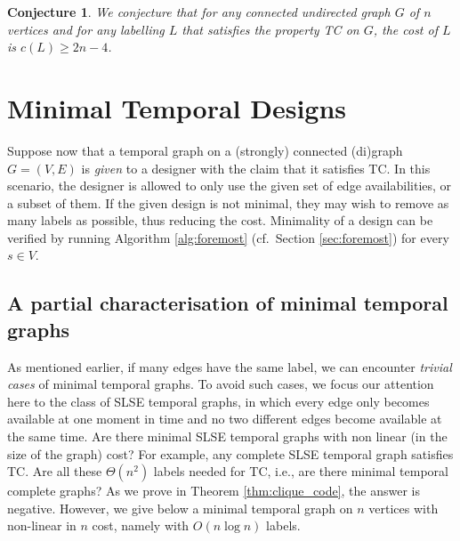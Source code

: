 \documentclass[a4paper,UKenglish]{article}
\newtheorem*{conjecture*}{Conjecture}
\begin{document}
\begin{conjecture*}
We conjecture that for any connected undirected graph $G$ of $n$ vertices and for any labelling $L$ that satisfies the property TC on $G$, the cost of $L$ is $c(L)\geq 2n-4$.
\end{conjecture*}


























\section{Minimal Temporal Designs}\label{sec:minimal}
Suppose now that a temporal graph on a (strongly) connected (di)graph $G=(V,E)$ is \emph{given} to a designer with the claim that it satisfies TC. In this scenario, the designer is allowed to only use the given set of edge availabilities, or a subset of them. If the given design is not minimal, they may wish to remove as many labels as possible, thus reducing the cost. Minimality of a design can be verified by running Algorithm \ref{alg:foremost} (cf.~Section \ref{sec:foremost}) for every $s\in V$.



\subsection{A partial characterisation of minimal temporal graphs}\label{sec:full_paper_hyper}
As mentioned earlier, if many edges have the same label, we can encounter \emph{trivial cases} of minimal temporal graphs. To avoid such cases, we focus our attention here to the class of SLSE temporal graphs, in which every edge only becomes available at one moment in time and no two different edges become available at the same time. Are there minimal SLSE temporal graphs with non linear (in the size of the graph) cost? For example, any complete SLSE temporal graph satisfies TC. Are all these $\Theta(n^2)$ labels needed for TC, i.e., are there minimal temporal complete graphs? As we prove in Theorem \ref{thm:clique_code}, the answer is negative. However, we give below a minimal temporal graph on $n$ vertices with non-linear in $n$ cost, namely with $O(n\log{n})$ labels.
\end{document}
